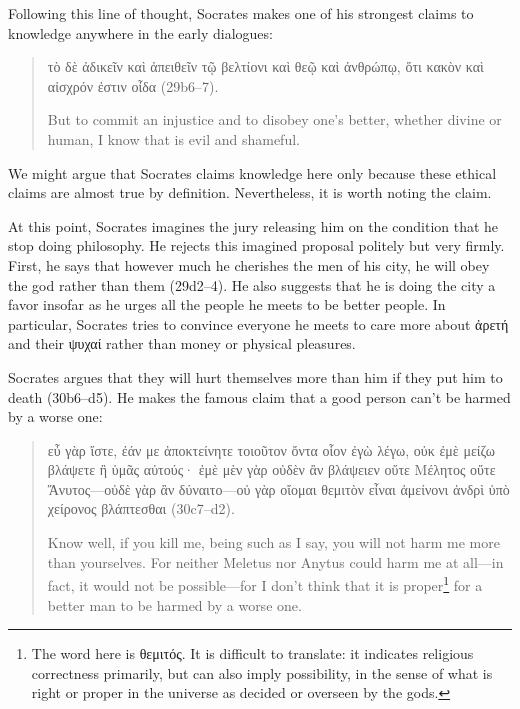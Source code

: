 \documentclass[11pt]{article}
\begin{document}
Following this line of thought, Socrates makes one of his strongest claims to knowledge anywhere in the early dialogues:

\begin{quote}

    {\g
    τὸ δὲ ἀδικεῖν καὶ ἀπειθεῖν τῷ βελτίονι καὶ θεῷ καὶ ἀνθρώπῳ, ὅτι κακὸν καὶ αἰσχρόν ἐστιν οἶδα
    } (29b6--7).

    But to commit an injustice and to disobey one's better, whether divine or human, I know that is evil and shameful.

\end{quote}

We might argue that Socrates claims knowledge here only because these ethical claims are almost true by definition.  Nevertheless, it is worth noting the claim.

At this point, Socrates imagines the jury releasing him on the condition that he stop doing philosophy.  He rejects this imagined proposal politely but very firmly.  First, he says that however much he cherishes the men of his city, he will obey the god rather than them (29d2--4).  He also suggests that he is doing the city a favor insofar as he urges all the people he meets to be better people.  In particular, Socrates tries to convince everyone he meets to care more about {\g ἀρετή} and their {\g ψυχαί} rather than money or physical pleasures.

Socrates argues that they will hurt themselves more than him if they put him to death (30b6--d5).  He makes the famous claim that a good person can't be harmed by a worse one:

\begin{quote}
    {\g
    εὖ γὰρ ἴστε, ἐάν με ἀποκτείνητε τοιοῦτον ὄντα οἷον ἐγὼ λέγω, οὐκ ἐμὲ μείζω βλάψετε ἢ ὑμᾶς αὐτούς· ἐμὲ μὲν γὰρ οὐδὲν ἂν βλάψειεν οὔτε Μέλητος οὔτε Ἄνυτος---οὐδὲ γὰρ ἂν δύναιτο---οὐ γὰρ οἴομαι θεμιτὸν εἶναι ἀμείνονι ἀνδρὶ ὑπὸ χείρονος βλάπτεσθαι
    } (30c7--d2).

    Know well, if you kill me, being such as I say, you will not harm me more than yourselves. For neither Meletus nor Anytus could harm me at all---in fact, it would not be possible---for I don't think that it is proper\footnote{The word here is {\g θεμιτός}.  It is difficult to translate: it indicates religious correctness primarily, but can also imply possibility, in the sense of what is right or proper in the universe as decided or overseen by the gods.} for a better man to be harmed by a worse one.

\end{quote}
\end{document}
